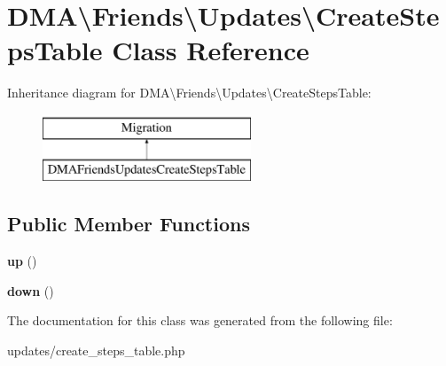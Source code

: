 \hypertarget{classDMA_1_1Friends_1_1Updates_1_1CreateStepsTable}{\section{D\-M\-A\textbackslash{}Friends\textbackslash{}Updates\textbackslash{}Create\-Steps\-Table Class Reference}
\label{classDMA_1_1Friends_1_1Updates_1_1CreateStepsTable}
}
Inheritance diagram for D\-M\-A\textbackslash{}Friends\textbackslash{}Updates\textbackslash{}Create\-Steps\-Table\-:\begin{figure}[H]
\begin{center}
\leavevmode
\includegraphics[height=2.000000cm]{df/d50/classDMA_1_1Friends_1_1Updates_1_1CreateStepsTable}
\end{center}
\end{figure}
\subsection*{Public Member Functions}
\begin{DoxyCompactItemize}
\item 
\hypertarget{classDMA_1_1Friends_1_1Updates_1_1CreateStepsTable_acdf2a72d46d5dd755d0c642c31ba834c}{{\bfseries up} ()}\label{classDMA_1_1Friends_1_1Updates_1_1CreateStepsTable_acdf2a72d46d5dd755d0c642c31ba834c}

\item 
\hypertarget{classDMA_1_1Friends_1_1Updates_1_1CreateStepsTable_a8dbe3cc73698589aa2349c3e5392317f}{{\bfseries down} ()}\label{classDMA_1_1Friends_1_1Updates_1_1CreateStepsTable_a8dbe3cc73698589aa2349c3e5392317f}

\end{DoxyCompactItemize}


The documentation for this class was generated from the following file\-:\begin{DoxyCompactItemize}
\item 
updates/create\-\_\-steps\-\_\-table.\-php\end{DoxyCompactItemize}
